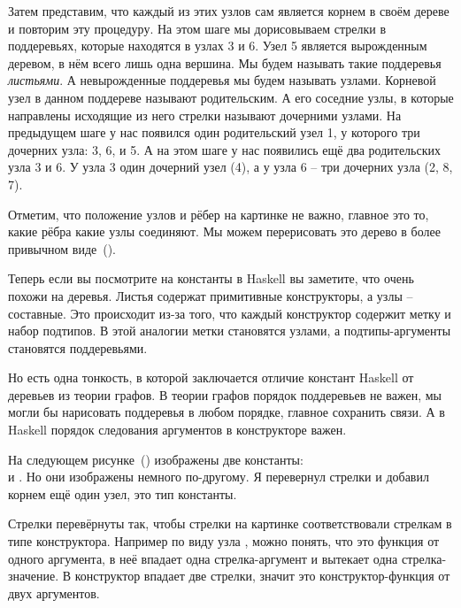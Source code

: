 
Затем представим, что каждый из этих узлов сам является корнем в своём
дереве и повторим эту процедуру. На этом шаге мы дорисовываем стрелки в
поддеревьях, которые находятся в узлах 3 и 6. Узел 5 является
вырожденным деревом, в нём всего лишь одна вершина. Мы будем называть
такие поддеревья \emph{листьями}. А невырожденные поддеревья мы будем
называть узлами. Корневой узел в данном поддереве называют родительским.
А его соседние узлы, в которые направлены исходящие из него стрелки
называют дочерними узлами. На предыдущем шаге у нас появился один
родительский узел 1, у которого три дочерних узла: 3, 6, и 5. А на этом
шаге у нас появились ещё два родительских узла 3 и 6. У узла 3 один
дочерний узел (4), а у узла 6 -- три дочерних узла (2, 8, 7).


Отметим, что положение узлов и рёбер на картинке не важно, главное это
то, какие рёбра какие узлы соединяют. Мы можем перерисовать это дерево в
более привычном виде~().

Теперь если вы посмотрите на константы в Haskell вы заметите, что очень
похожи на деревья. Листья содержат примитивные конструкторы, а узлы --
составные. Это происходит из-за того, что каждый конструктор содержит
метку и набор подтипов. В этой аналогии метки становятся узлами, а
подтипы-аргументы становятся поддеревьями.


Но есть одна тонкость, в которой заключается отличие констант Haskell от
деревьев из теории графов. В теории графов порядок поддеревьев не важен,
мы могли бы нарисовать поддеревья в любом порядке, главное сохранить
связи. А в Haskell порядок следования аргументов в конструкторе важен.

На следующем рисунке~() изображены две
константы:\\ и
. Но они изображены немного
по-другому. Я перевернул стрелки и добавил корнем ещё один узел, это тип
константы.


Стрелки перевёрнуты так, чтобы стрелки на картинке соответствовали
стрелкам в типе конструктора. Например по виду узла
, можно понять, что это функция от одного
аргумента, в неё впадает одна стрелка-аргумент и вытекает одна
стрелка-значение. В конструктор  впадает две стрелки, значит это
конструктор-функция от двух аргументов.

